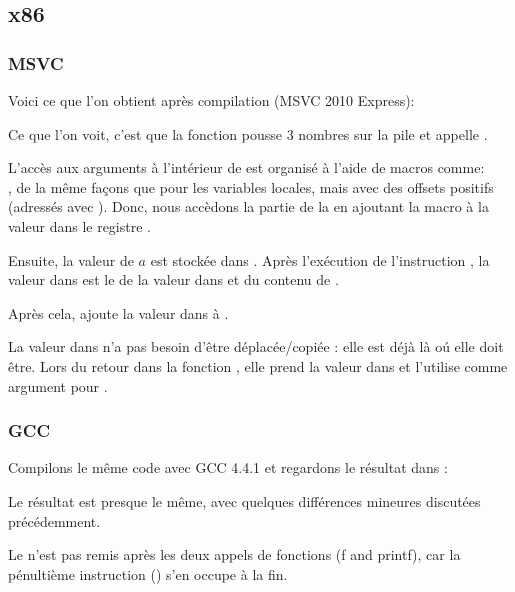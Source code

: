 \subsection{x86}

\subsubsection{MSVC}

Voici ce que l'on obtient après compilation (MSVC 2010 Express):




Ce que l'on voit, c'est que la fonction \main pousse 3 nombres sur la pile et appelle
.

L'accès aux arguments à l'intérieur de \ttf est organisé à l'aide de macros
comme:\\
,
de la même façons que pour les variables locales, mais avec des offsets positifs
(adressés avec ).
Donc, nous accèdons la partie  de la 
en ajoutant la macro  à la valeur dans le registre \EBP.


Ensuite, la valeur de $a$ est stockée dans \EAX. Après l'exécution de l'instruction
\IMUL, la valeur dans \EAX est le  de la valeur dans \EAX
et du contenu de .

Après cela, \ADD ajoute la valeur dans  à \EAX.

La valeur dans \EAX n'a pas besoin d'être déplacée/copiée : elle est déjà là
oú elle doit être.
Lors du retour dans la fonction , elle prend la valeur dans
\EAX et l'utilise comme argument pour \printf.



\subsubsection{GCC}

Compilons le même code avec GCC 4.4.1 et regardons le résultat dans \IDA:



Le résultat est presque le même, avec quelques différences mineures discutées
précédemment.

Le  n'est pas remis après les deux appels
de fonctions (f and printf), car la pénultième instruction  ()
s'en occupe à la fin.
